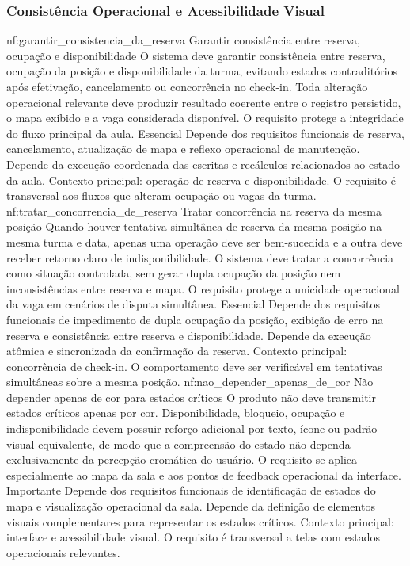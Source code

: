 \subsubsection*{Consistência Operacional e Acessibilidade Visual}
\reqfuncfull
{nf:garantir_consistencia_da_reserva}
{Garantir consistência entre reserva, ocupação e disponibilidade}
{O sistema deve garantir consistência entre reserva, ocupação da posição e disponibilidade da turma, evitando estados contraditórios após efetivação, cancelamento ou concorrência no check-in. Toda alteração operacional relevante deve produzir resultado coerente entre o registro persistido, o mapa exibido e a vaga considerada disponível. O requisito protege a integridade do fluxo principal da aula.}
{Essencial}
{Depende dos requisitos funcionais de reserva, cancelamento, atualização de mapa e reflexo operacional de manutenção. Depende da execução coordenada das escritas e recálculos relacionados ao estado da aula.}
{Contexto principal: operação de reserva e disponibilidade. O requisito é transversal aos fluxos que alteram ocupação ou vagas da turma.}
\reqfuncfull
{nf:tratar_concorrencia_de_reserva}
{Tratar concorrência na reserva da mesma posição}
{Quando houver tentativa simultânea de reserva da mesma posição na mesma turma e data, apenas uma operação deve ser bem-sucedida e a outra deve receber retorno claro de indisponibilidade. O sistema deve tratar a concorrência como situação controlada, sem gerar dupla ocupação da posição nem inconsistências entre reserva e mapa. O requisito protege a unicidade operacional da vaga em cenários de disputa simultânea.}
{Essencial}
{Depende dos requisitos funcionais de impedimento de dupla ocupação da posição, exibição de erro na reserva e consistência entre reserva e disponibilidade. Depende da execução atômica e sincronizada da confirmação da reserva.}
{Contexto principal: concorrência de check-in. O comportamento deve ser verificável em tentativas simultâneas sobre a mesma posição.}
\reqfuncfull
{nf:nao_depender_apenas_de_cor}
{Não depender apenas de cor para estados críticos}
{O produto não deve transmitir estados críticos apenas por cor. Disponibilidade, bloqueio, ocupação e indisponibilidade devem possuir reforço adicional por texto, ícone ou padrão visual equivalente, de modo que a compreensão do estado não dependa exclusivamente da percepção cromática do usuário. O requisito se aplica especialmente ao mapa da sala e aos pontos de feedback operacional da interface.}
{Importante}
{Depende dos requisitos funcionais de identificação de estados do mapa e visualização operacional da sala. Depende da definição de elementos visuais complementares para representar os estados críticos.}
{Contexto principal: interface e acessibilidade visual. O requisito é transversal a telas com estados operacionais relevantes.}

